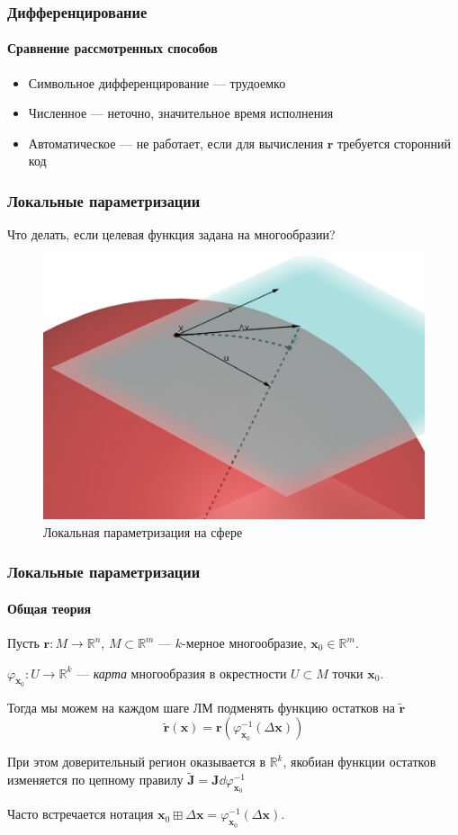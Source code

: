 \documentclass[notheorems,aspectratio=169]{beamer}
\begin{document}
\begin{frame}
  \frametitle{Дифференцирование}
  \framesubtitle{Сравнение рассмотренных способов}
  \begin{itemize}
    \item Символьное дифференцирование --- трудоемко
    \item Численное ---  неточно, значительное время исполнения
    \item Автоматическое --- не работает, если для вычисления $\mathbf{r}$ требуется сторонний код
  \end{itemize}
\end{frame}

\begin{frame}
  \frametitle{Локальные параметризации}
  Что делать, если целевая функция задана на многообразии?

  \begin{figure}
    \includegraphics[height=0.7\textheight, keepaspectratio]{sphere-local.png}
    \caption*{Локальная параметризация на сфере}
  \end{figure}
\end{frame}

\begin{frame}
  \frametitle{Локальные параметризации}
  \framesubtitle{Общая теория}
  Пусть $\mathbf{r}: M\to\mathbb{R}^n$, $M\subset \mathbb{R}^m$ --- $k$-мерное многообразие, $\mathbf{x}_0\in \mathbb{R}^m$.

  $\varphi_{\mathbf{x}_0}:U\to \mathbb{R}^k$ --- \emph{карта} многообразия в окрестности $U\subset M$ точки $\mathbf{x}_0$.
 
  Тогда мы можем на каждом шаге ЛМ подменять функцию остатков на $\mathbf{\tilde{r}}$
  $$ \mathbf{\tilde{r}}\left(\mathbf{x}\right)=\mathbf{r}\left(\varphi_{\mathbf{x}_0}^{-1}\left(\Delta\mathbf{x}\right)\right)$$

  При этом доверительный регион оказывается в $\mathbb{R}^k$, якобиан функции остатков изменяется по цепному правилу $\mathbf{\tilde{J}}=\mathbf{J}\dd{\varphi_{\mathbf{x}_0}^{-1}}$
\vspace{0.7cm}

  Часто встречается нотация $\mathbf{x}_0\boxplus\Delta\mathbf{x}=\varphi_{\mathbf{x}_0}^{-1}\left(\Delta\mathbf{x}\right)$.
\end{frame}
\end{document}
